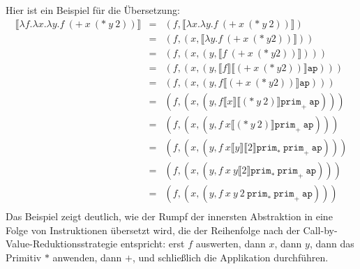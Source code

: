Hier ist ein Beispiel für die Übersetzung:
%
\begin{eqnarray*}
  \llbracket \lambda f.\lambda x.\lambda y.f~(+~x~(*~y~2))\rrbracket
  &=&
  (f, \llbracket \lambda x.\lambda y.f~(+~x~(*~y~2))\rrbracket)\\
  &=&
  (f, (x, \llbracket \lambda y.f~(+~x~(*~y 2))\rrbracket))\\
  &=&
  (f, (x, (y, \llbracket f~(+~x~(*~y 2))\rrbracket)))\\
  &=&
  (f, (x, (y, \llbracket f\rrbracket \llbracket (+~x~(*~y
  2))\rrbracket \mathtt{ap})))\\
  &=&
  (f, (x, (y, f \llbracket (+~x~(*~y 2))\rrbracket\mathtt{ap})))\\
  &=&
  (f, (x, (y, f \llbracket x\rrbracket \llbracket (*~y~2)\rrbracket \mathtt{prim}_+~\mathtt{ap})))\\
  &=&
  (f, (x, (y, f~x \llbracket (*~y~2)\rrbracket \mathtt{prim}_+~\mathtt{ap})))\\
  &=&
  (f, (x, (y, f~x \llbracket y\rrbracket \llbracket 2\rrbracket \mathtt{prim}_*~\mathtt{prim}_+~\mathtt{ap})))\\
  &=&
  (f, (x, (y, f~x~y \llbracket 2\rrbracket \mathtt{prim}_*~\mathtt{prim}_+~\mathtt{ap})))\\
  &=&
  (f, (x, (y, f~x~y~2~\mathtt{prim}_*~\mathtt{prim}_+~\mathtt{ap})))\\
\end{eqnarray*}
%
Das Beispiel zeigt deutlich, wie der Rumpf der innersten Abstraktion
in eine Folge von Instruktionen übersetzt wird, die der Reihenfolge
nach der Call-by-Value-Reduktionsstrategie entspricht: erst $f$
auswerten, dann $x$, dann $y$, dann das Primitiv $*$ anwenden, dann
$+$, und schließlich die Applikation durchführen.

